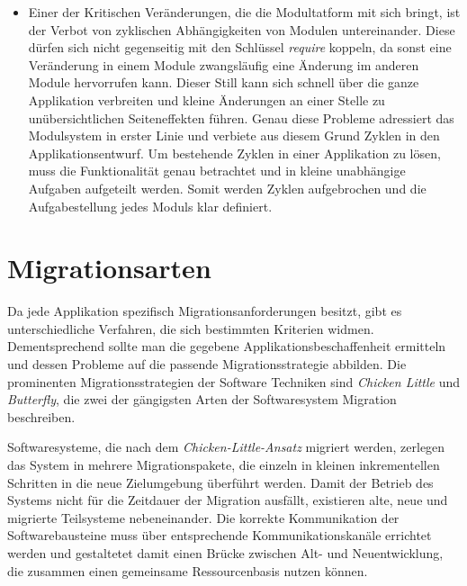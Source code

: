 \begin{itemize}
	\item Einer der Kritischen Veränderungen, die die Modultatform mit sich bringt, ist der Verbot von zyklischen Abhängigkeiten von Modulen untereinander. Diese dürfen sich nicht gegenseitig mit den Schlüssel \textit{require} koppeln, da sonst eine Veränderung in einem Module zwangsläufig eine Änderung im anderen Module hervorrufen kann. Dieser Still kann sich schnell über die ganze Applikation verbreiten und kleine Änderungen an einer Stelle zu unübersichtlichen Seiteneffekten führen. Genau diese Probleme adressiert das Modulsystem in erster Linie und verbiete aus diesem Grund Zyklen in den Applikationsentwurf. Um bestehende Zyklen in einer Applikation zu lösen, muss die Funktionalität genau betrachtet und in kleine unabhängige Aufgaben aufgeteilt werden. Somit werden Zyklen aufgebrochen und die Aufgabestellung jedes Moduls klar definiert. \cite{java9modRevealed,modulProgJava9,modulMitJava9} 
\end{itemize}

\section{Migrationsarten} \label{Migratiosarten}

	Da jede Applikation spezifisch Migrationsanforderungen besitzt, gibt es unterschiedliche Verfahren, die sich bestimmten Kriterien widmen. Dementsprechend sollte man die gegebene Applikationsbeschaffenheit ermitteln und dessen Probleme auf die passende Migrationsstrategie abbilden. Die prominenten Migrationsstrategien der Software Techniken sind \textit{Chicken Little} und \textit{Butterfly}, die zwei der gängigsten Arten der Softwaresystem Migration beschreiben. \cite{sneed2016softwaremigration} \bigbreak


	Softwaresysteme, die nach dem \textit{Chicken-Little-Ansatz} migriert werden, zerlegen das System in mehrere Migrationspakete, die einzeln in kleinen inkrementellen Schritten in die neue Zielumgebung überführt werden. Damit der Betrieb des Systems nicht für die Zeitdauer der Migration ausfällt, existieren alte, neue und migrierte Teilsysteme nebeneinander. Die korrekte Kommunikation der Softwarebausteine muss über entsprechende Kommunikationskanäle errichtet werden und gestaltetet damit einen Brücke zwischen Alt- und Neuentwicklung, die zusammen einen gemeinsame Ressourcenbasis nutzen können. \cite{sneed2016softwaremigration} \bigbreak

